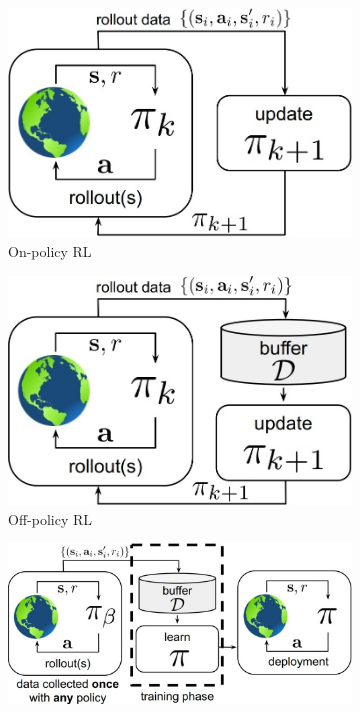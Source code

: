 \begin{figure}[htbp]
     \centering
     \begin{subfigure}[b]{0.25\textwidth}
         \centering
         \includegraphics[width=\textwidth]{Figures/images/RL_methods/onpolicy.jpg}
         \caption{On-policy RL}
         \label{fig:onpolicy}
     \end{subfigure}
     \hfill
     \begin{subfigure}[b]{0.25\textwidth}
         \includegraphics[width=\textwidth]{Figures/images/RL_methods/offpolicy.jpg}
         \caption{Off-policy RL}
         \label{fig:offpolicy}
     \end{subfigure}
     \hfill
     \begin{subfigure}[b]{0.35\textwidth}
         \includegraphics[width=\textwidth]{Figures/images/RL_methods/offline.jpg}

\end{subfigure}
\end{figure}

